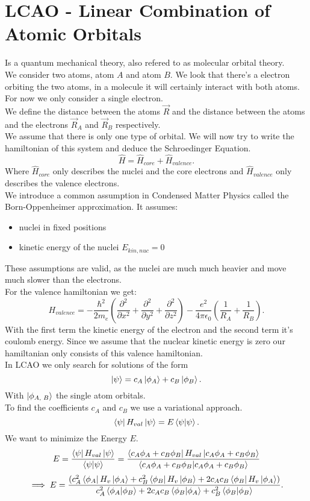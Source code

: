 \documentclass{report}
\begin{document}
\section{LCAO - Linear Combination of Atomic Orbitals}
Is a quantum mechanical theory, also refered to as molecular orbital theory.\\
We consider two atoms, atom $A$ and atom $B$. We look that there's a electron orbiting the two atoms, in a molecule it will certainly interact with both atoms. For now we only consider a single electron.\\
We define the distance between the atoms $\vec{R}$ and the distance between the atoms and the electrons $\vec{R}_A$ and $\vec{R}_B$ respectively.\\
We assume that there is only one type of orbital. We will now try to write the hamiltonian of this system and deduce the Schroedinger Equation. \[
	\hat{H} = \hat{H}_{core} + \hat{H}_{valence}
.\] Where $\hat{H}_{core}$ only describes the nuclei and the core electrons and $\hat{H}_{valence}$ only describes the valence electrons.\\
We introduce a common assumption in Condensed Matter Physics called the Born-Oppenheimer approximation. It assumes:
\begin{itemize}
	\item nuclei in fixed positions
	\item kinetic energy of the nuclei $E_{kin,nuc} = 0$
\end{itemize}
These assumptions are valid, as the nuclei are much much heavier and move much slower than the electrons.\\
For the valence hamiltonian we get: \[
	H_{valence} = -\frac{\hbar^2}{2 m_e} \left( \frac{\partial^2}{\partial x^2} + \frac{\partial^2}{\partial y^2} + \frac{\partial^2}{\partial z^2} \right) - \frac{e^2}{4 \pi \epsilon_0} \left( \frac{1}{R_A} + \frac{1}{R_B} \right) 
.\] With the first term the kinetic energy of the electron and the second term it's coulomb energy. Since we assume that the nuclear kinetic energy is zero our hamiltanian only consists of this valence hamiltonian.\\
In LCAO we only search for solutions of the form \[
\ket{\psi} =  c_A \ket{\phi_A} +  c_B \ket{\phi_B}  
.\] With $\ket{\phi_{A\text{, }B}} $ the single atom orbitals. \\
To find the coefficients $c_A$ and $c_B$ we use a variational approach. \[
	\bra{\psi} H_{val} \ket{\psi }  = E \bra{\psi } \ket{\psi}  
.\] We want to minimize the Energy $E$. \[
E = \frac{\bra{ \psi } H_{val} \ket{\psi } }{\bra{\psi } \ket{\psi } } = \frac{\bra{c_A \phi_A + c_B \phi_B} H_{val} \ket{c_A \phi_A + c_B \phi_B} }{\bra{c_A \phi_A + c_B \phi_B} \ket{c_A \phi_A + c_B \phi_B} }
\] \[
\implies E = \frac{(c_A^2 \bra{\phi_A} H_v \ket{\phi_A} + c_B^2 \bra{\phi_B} H_v \ket{\phi_B} + 2c_Ac_B \bra{\phi_B} H_v \ket{\phi_A})} {c_A^2 \bra{\phi_A} \ket{\phi_B} + 2c_Ac_B \bra{\phi_B} \ket{\phi_A} +c_B^2 \bra{\phi_B} \ket{\phi_B}  }
.\]  
\end{document}
